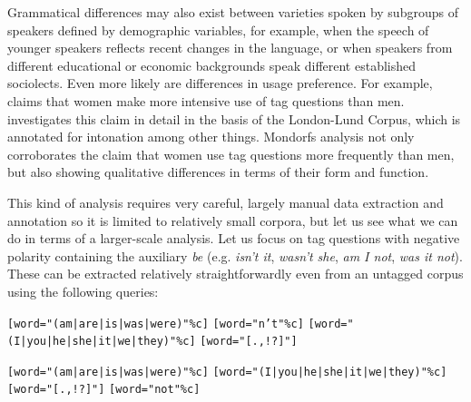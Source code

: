 Grammatical differences may also exist between varieties spoken by subgroups of speakers defined by demographic variables, for example, when the speech of younger speakers reflects recent changes in the language, or when speakers from different educational or economic backgrounds speak different established sociolects. Even more likely are differences in usage preference. For example, \citet{lakoff_language_1973} claims that women make more intensive use of tag questions than men. \citet{mondorf_syntactic_2004} investigates this claim in detail in the basis of the London-Lund Corpus, which is annotated for intonation among other things. Mondorfs analysis not only corroborates the claim that women use tag questions more frequently than men, but also showing qualitative differences in terms of their form and function.

This kind of analysis requires very careful, largely manual data extraction and annotation so it is limited to relatively small corpora, but let us see what we can do in terms of a larger-scale analysis. Let us focus on tag questions with negative polarity containing the auxiliary \textit{be} (e.g. \textit{isn't it}, \textit{wasn't she}, \textit{am I not}, \textit{was it not}). These can be extracted relatively straightforwardly even from an untagged corpus using the following queries:

\begin{exe}
\ex
\begin{xlist} 
\label{ex:querytag}
\ex \begin{minipage}[t]{0.85\textwidth} \raggedright \texttt{[word="(am|\allowbreak are|\allowbreak is|\allowbreak was|\allowbreak were)"\%c]} \texttt{[word="n't"\%c]} \texttt{[word="(I|\allowbreak you|\allowbreak he|\allowbreak she|\allowbreak it|\allowbreak we|\allowbreak they)"\%c]} \texttt{[word="[.,!?]"]} \end{minipage}
\ex \begin{minipage}[t]{0.85\textwidth} \raggedright \texttt{[word="(am|\allowbreak are|\allowbreak is|\allowbreak was|\allowbreak were)"\%c]} \texttt{[word="(I|\allowbreak you|\allowbreak he|\allowbreak she|\allowbreak it|\allowbreak we|\allowbreak they)"\%c]} \texttt{[word="[.,!?]"]} \texttt{[word="not"\%c]} \end{minipage}
\end{xlist}
\end{exe}

